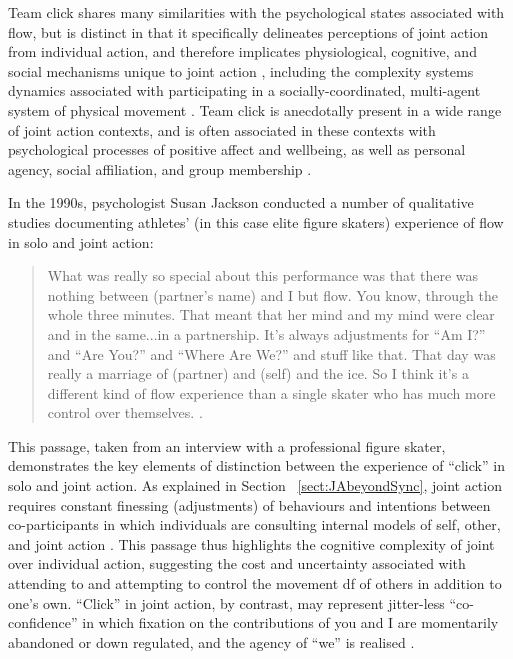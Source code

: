 \begin{CJK}{UTF8}{gbsn}
    Team click shares many similarities with the psychological states associated with flow, but is distinct in that it specifically delineates perceptions of joint action from individual action, and therefore implicates physiological, cognitive, and social mechanisms unique to joint action \citep{Vesper2010}, including the complexity systems dynamics associated with participating in a socially-coordinated, multi-agent system of physical movement \citep{Kelso2009}.  Team click is anecdotally present in a wide range of joint action contexts, and is often associated in these contexts with psychological processes of positive affect and wellbeing, as well as personal agency, social affiliation, and group membership \citep{Jackson1995,Marsh2009,Wheatley2012,Slingerland2014}.

    In the 1990s, psychologist Susan Jackson conducted a number of qualitative studies documenting athletes' (in this case elite figure skaters) experience of flow in solo and joint action:

    \begin{quotation}
      What was really so special about this performance was that there was nothing between (partner's name) and I but flow.  You know, through the whole three minutes.  That meant that her mind and my mind were clear and in the same...in a partnership. It’s always adjustments for ``Am I?'' and ``Are You?'' and ``Where Are We?'' and stuff like that.  That day was really a marriage of (partner) and (self) and the ice.  So I think it’s a different kind of flow experience than a single skater who has much more control over themselves. \citep[173-4]{Jackson1992}.
    \end{quotation}

    This passage, taken from an interview with a professional figure skater, demonstrates the key elements of distinction between the experience of ``click'' in solo and joint action.  As explained in Section ~\ref{sect:JAbeyondSync}, joint action requires constant finessing (adjustments) of behaviours and intentions between co-participants in which individuals are consulting internal models of self, other, and joint action \citep{Pesquita2017}. This passage thus highlights the cognitive complexity of joint over individual action, suggesting the cost and uncertainty associated with attending to and attempting to control the movement df of others in addition to one's own.  ``Click'' in joint action, by contrast, may represent jitter-less ``co-confidence'' in which fixation on the contributions of you and I are momentarily abandoned or down regulated, and the agency of ``we'' is realised \citep{Gallotti2013,Friston2015,Noy2017}.


\end{CJK}
